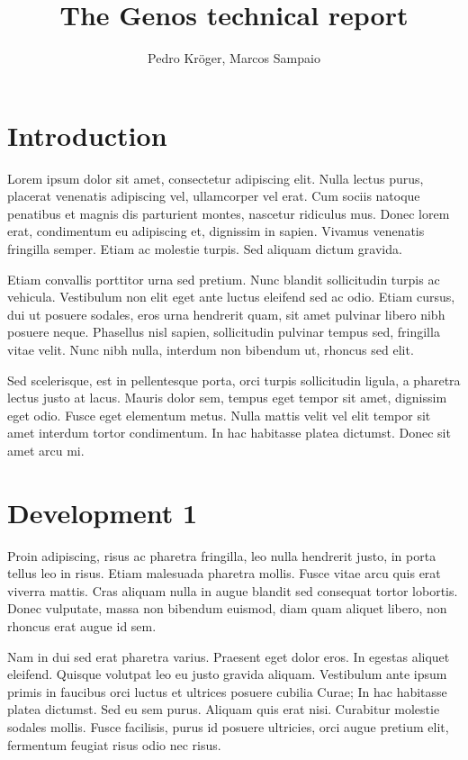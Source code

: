\documentclass{genos-technical-report}
\title{The Genos technical report}
\author{Pedro Kröger\inst{1}, Marcos Sampaio\inst{2}}
\begin{document}
\cover{}

\section{Introduction}
\label{sec:introduction}

Lorem ipsum dolor sit amet, consectetur adipiscing elit. Nulla lectus
purus, placerat venenatis adipiscing vel, ullamcorper vel erat. Cum
sociis natoque penatibus et magnis dis parturient montes, nascetur
ridiculus mus. Donec lorem erat, condimentum eu adipiscing et,
dignissim in sapien. Vivamus venenatis fringilla semper. Etiam ac
molestie turpis. Sed aliquam dictum gravida.

Etiam convallis porttitor urna sed pretium. Nunc blandit sollicitudin
turpis ac vehicula. Vestibulum non elit eget ante luctus eleifend sed
ac odio. Etiam cursus, dui ut posuere sodales, eros urna hendrerit
quam, sit amet pulvinar libero nibh posuere neque. Phasellus nisl
sapien, sollicitudin pulvinar tempus sed, fringilla vitae velit. Nunc
nibh nulla, interdum non bibendum ut, rhoncus sed elit.

Sed scelerisque, est in pellentesque porta, orci turpis sollicitudin
ligula, a pharetra lectus justo at lacus. Mauris dolor sem, tempus
eget tempor sit amet, dignissim eget odio. Fusce eget elementum
metus. Nulla mattis velit vel elit tempor sit amet interdum tortor
condimentum. In hac habitasse platea dictumst. Donec sit amet arcu mi.

\section{Development 1}
\label{sec:development-1}

Proin adipiscing, risus ac pharetra fringilla, leo nulla hendrerit
justo, in porta tellus leo in risus. Etiam malesuada pharetra
mollis. Fusce vitae arcu quis erat viverra mattis. Cras aliquam nulla
in augue blandit sed consequat tortor lobortis. Donec vulputate, massa
non bibendum euismod, diam quam aliquet libero, non rhoncus erat augue
id sem.

Nam in dui sed erat pharetra varius. Praesent eget dolor eros. In
egestas aliquet eleifend. Quisque volutpat leo eu justo gravida
aliquam. Vestibulum ante ipsum primis in faucibus orci luctus et
ultrices posuere cubilia Curae; In hac habitasse platea dictumst. Sed
eu sem purus. Aliquam quis erat nisi. Curabitur molestie sodales
mollis. Fusce facilisis, purus id posuere ultricies, orci augue
pretium elit, fermentum feugiat risus odio nec risus.
\end{document}
